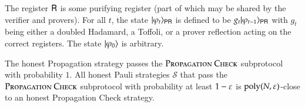 The register ${\mathsf{R}}$ is some purifying register (part of which may be shared by the verifier and provers). For all $t$, the state $|\varphi_t\rangle_{{\mathsf{P}} {\mathsf{R}}}$ is defined to be $g_t |\varphi_{t-1}\rangle_{{\mathsf{P}} {\mathsf{R}}}$ with $g_t$ being either a doubled Hadamard, a Toffoli, or a prover reflection acting on the correct registers. The state $|\varphi_0\rangle$ is arbitrary.

\begin{theorem}	
\label{thm:prop_check}
The honest Propagation strategy passes the $\textsc{Propagation Check}$ subprotocol with probability $1$. All honest Pauli strategies $\mathcal{S}$ that pass the $\textsc{Propagation Check}$ subprotocol with probability at least $1 - \varepsilon$ is $\operatorname{poly}(N,\varepsilon)$-close to an honest Propagation Check strategy. 
\end{theorem}
